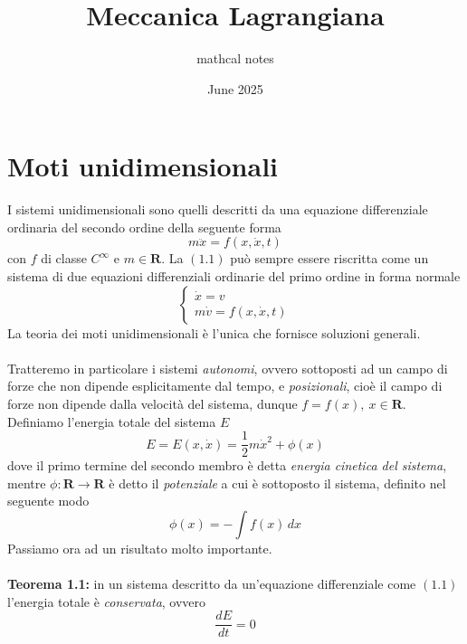 \documentclass{article}
\title{Meccanica Lagrangiana}
\author{mathcal notes}
\date{June 2025}
\begin{document}
\maketitle

\tableofcontents
\newpage

\section{Moti unidimensionali}
I sistemi unidimensionali sono quelli descritti da una equazione differenziale ordinaria del secondo ordine della seguente forma
\begin{equation}
    m\ddot{x} = f(x, \dot{x}, t) \tag{1.1}
\end{equation}
con $f$ di classe $C^{\infty}$ e $m \in \mathbf{R}$. La $(1.1)$ può sempre essere riscritta come un sistema di due equazioni differenziali ordinarie del primo ordine in forma normale
\begin{equation}
    \begin{cases}
        \dot{x} = v \\
        m\dot{v} = f(x, \dot{x}, t)
    \end{cases} \tag{1.2}
\end{equation}
La teoria dei moti unidimensionali è l'unica che fornisce soluzioni generali. \\ \\
Tratteremo in particolare i sistemi \textit{autonomi}, ovvero sottoposti ad un campo di forze che non dipende esplicitamente dal tempo, e \textit{posizionali}, cioè il campo di forze non dipende dalla velocità del sistema, dunque $f = f(x), \ x \in \mathbf{R}$. \\
Definiamo l'energia totale del sistema $E$
\begin{equation}
    E = E(x, \dot{x}) = \frac{1}{2}m\dot{x}^2 + \phi(x) \tag{1.3}
\end{equation}
dove il primo termine del secondo membro è detta \textit{energia cinetica del sistema}, mentre $\phi : \mathbf{R} \longrightarrow \mathbf{R}$ è detto il \textit{potenziale} a cui è sottoposto il sistema, definito nel seguente modo
\begin{equation}
    \phi(x) = - \int f(x) \, dx \tag{1.4}
\end{equation}
Passiamo ora ad un risultato molto importante. \\ \\
\textbf{Teorema 1.1:} in un sistema descritto da un'equazione differenziale come $(1.1)$ l'energia totale è \textit{conservata}, ovvero
\begin{equation}
    \frac{d E}{d t} = 0 \tag{1.5}
\end{equation}
\end{document}
